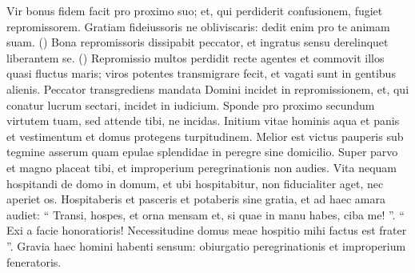 \begin{biblechapter}
\begin{biblechapter}
\begin{biblechapter}
\begin{biblechapter}
\begin{biblechapter}
\begin{biblechapter}
\begin{biblechapter}
\begin{biblechapter}
\begin{biblechapter}
\begin{biblechapter}
\begin{biblechapter}
\begin{biblechapter}
\begin{biblechapter}
\begin{biblechapter}
\begin{biblechapter}
\begin{biblechapter}
\begin{biblechapter}
\begin{biblechapter}
\begin{biblechapter}
\begin{biblechapter}
\begin{biblechapter}
\begin{biblechapter}
\begin{biblechapter}
\begin{biblechapter}
\begin{biblechapter}
\begin{biblechapter}
\begin{biblechapter}
\begin{biblechapter}
\begin{biblechapter}
 \verse Vir bonus fidem facit pro proximo suo;
 et, qui perdiderit confusionem, fugiet repromissorem.
 \verse Gratiam fideiussoris ne obliviscaris:
 dedit enim pro te animam suam. (\verse)
 \verse Bona repromissoris dissipabit peccator,
 et ingratus sensu derelinquet liberantem se. (\verse)
 \verse Repromissio multos perdidit recte agentes
 et commovit illos quasi fluctus maris;
 \verse viros potentes transmigrare fecit,
 et vagati sunt in gentibus alienis.
 \verse Peccator transgrediens mandata Domini
 incidet in repromissionem,
 et, qui conatur lucrum sectari, incidet in iudicium.
 \verse Sponde pro proximo secundum virtutem tuam,
 sed attende tibi, ne incidas.
 \verse Initium vitae hominis aqua et panis et vestimentum
 et domus protegens turpitudinem.
 \verse Melior est victus pauperis sub tegmine asserum
 quam epulae splendidae in peregre sine domicilio.
 \verse Super parvo et magno placeat tibi,
 et improperium peregrinationis non audies.
 \verse Vita nequam hospitandi de domo in domum,
 et ubi hospitabitur, non fiducialiter aget, nec aperiet os.
 \verse Hospitaberis et pasceris et potaberis sine gratia,
 et ad haec amara audiet:
 \verse “ Transi, hospes, et orna mensam
 et, si quae in manu habes, ciba me! ”.
 \verse “ Exi a facie honoratioris!
 Necessitudine domus meae hospitio mihi factus est frater ”.
 \verse Gravia haec homini habenti sensum:
 obiurgatio peregrinationis et improperium feneratoris.
 

\end{biblechapter}
\end{biblechapter}
\end{biblechapter}
\end{biblechapter}
\end{biblechapter}
\end{biblechapter}
\end{biblechapter}
\end{biblechapter}
\end{biblechapter}
\end{biblechapter}
\end{biblechapter}
\end{biblechapter}
\end{biblechapter}
\end{biblechapter}
\end{biblechapter}
\end{biblechapter}
\end{biblechapter}
\end{biblechapter}
\end{biblechapter}
\end{biblechapter}
\end{biblechapter}
\end{biblechapter}
\end{biblechapter}
\end{biblechapter}
\end{biblechapter}
\end{biblechapter}
\end{biblechapter}
\end{biblechapter}
\end{biblechapter}
